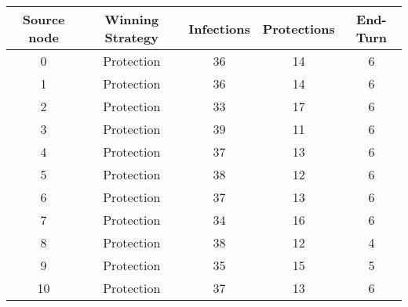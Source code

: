 \documentclass[results.tex]{subfiles}
\begin{document}
    \begin{center}
        \begin{tabular}{| c || c | c | c | c |}
            \hline
            {\bfseries Source node} & {\bfseries Winning Strategy} & {\bfseries Infections} & {\bfseries Protections}
            & {\bfseries End-Turn}
            \\  %
            \hline\hline
            0                       & Protection                   & 36                     & 14                      & 6                    \\
            \hline
            1                       & Protection                   & 36                     & 14                      & 6                    \\
            \hline
            2                       & Protection                   & 33                     & 17                      & 6                    \\
            \hline
            3                       & Protection                   & 39                     & 11                      & 6                    \\
            \hline
            4                       & Protection                   & 37                     & 13                      & 6                    \\
            \hline
            5                       & Protection                   & 38                     & 12                      & 6                    \\
            \hline
            6                       & Protection                   & 37                     & 13                      & 6                    \\
            \hline
            7                       & Protection                   & 34                     & 16                      & 6                    \\
            \hline
            8                       & Protection                   & 38                     & 12                      & 4                    \\
            \hline
            9                       & Protection                   & 35                     & 15                      & 5                    \\
            \hline
            10                      & Protection                   & 37                     & 13                      & 6                    \\

\end{tabular}
\end{center}
\end{document}
